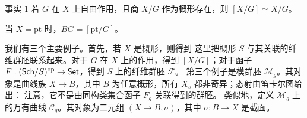 \begin{custom}{事实 1}\hypertarget{fact:1}{}\hypertarget{fact:2.1}{}
若 $G$ 在 $X$ 上自由作用，且商 $X/G$ 作为概形存在，则 $[X/G]\simeq X/G$。
\end{custom}
\begin{example}[（$G$ 主丛的分类空间）]\label{ex:2.6}
当 $X=\mathrm{pt}$ 时，$BG=[\mathrm{pt}/G]$。
\end{example}
我们有三个主要例子。首先，若 $X$ 是概形，则得到
这里把概形 $S$ 与其关联的纤维群胚联系起来。对于 $G$ 在 $X$ 上的作用，得到 $[X/G]$；对于函子 $F:(\mathsf{Sch}/S)^{\mathrm{op}}\to\mathsf{Set}$，得到 $S$ 上的纤维群胚 $\mathcal F$。
第三个例子是模群胚 $\mathcal M_g$。其对象是曲线族 $X\to B$，其中 $B$ 为任意概形，所有 $X_s$ 都非奇异；态射由笛卡尔图给出：
注意，它不是由同构类集合函子 $F_g$ 关联得到的群胚。
类似地，定义 $\mathcal M_g$ 上的万有曲线 $\mathcal C_g$。其对象为二元组 $(X\to B,\sigma)$，其中 $\sigma:B\to X$ 是截面。
